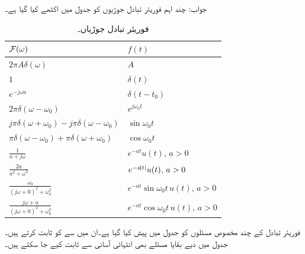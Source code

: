 جواب:
چند اہم فوریئر تبادل جوڑیوں کو جدول  میں اکٹھے کیا گیا ہے۔
\begin{table}
\caption{فوریئر تبادل جوڑیاں۔}
\label{جدول_فوریئر_بدل_جوڑیاں}
\centering
\begin{tabular}{l l}
$\mathcal{F}(\omega)$ & $f(t)$ \Bstrut \\
\hline
$2\pi A \delta(\omega)$&$A$ \Tstrut \\[2ex]
$1$&$\delta(t)$\\[1ex]
$e^{-j\omega a}$&$\delta(t-t_0)$\\[1ex]
 $2\pi \delta(\omega-\omega_0)$ &$e^{j\omega_0 t}$ \\[1ex]
 $j\pi \delta(\omega+\omega_0)-j\pi\delta(\omega-\omega_0)$ &$\sin \omega_0 t$ \\[1ex]
 $\pi \delta(\omega-\omega_0)+\pi\delta(\omega+\omega_0)$ &$\cos \omega_0 t$ \\[1ex]
 $\frac{1}{a+j\omega}$&$e^{-at}u(t), \, a>0$  \\[1ex]
 $\frac{2a}{a^2+\omega^2}$&$e^{-a\abs{t}}u(t), \, a>0 $  \\[1ex]
 $\frac{\omega_0}{(j\omega+0)^2+\omega_0^2}$ &$e^{-at} \sin \omega_0 t\, u(t), \, a>0$ \\[1ex]
 $\frac{j\omega+a}{(j\omega+0)^2+\omega_0^2}$ &$e^{-at} \cos \omega_0 t\, u(t), \, a>0$ 
\end{tabular}
\end{table}

فوریئر تبادل کے چند مخصوص مسئلوں کو جدول  میں پیش کیا گیا ہے۔ان میں سے  کو ثابت کرتے ہیں۔جدول میں دیے بقایا مسئلے بھی انتہائی آسانی سے ثابت کیے جا سکتے ہیں۔
 
